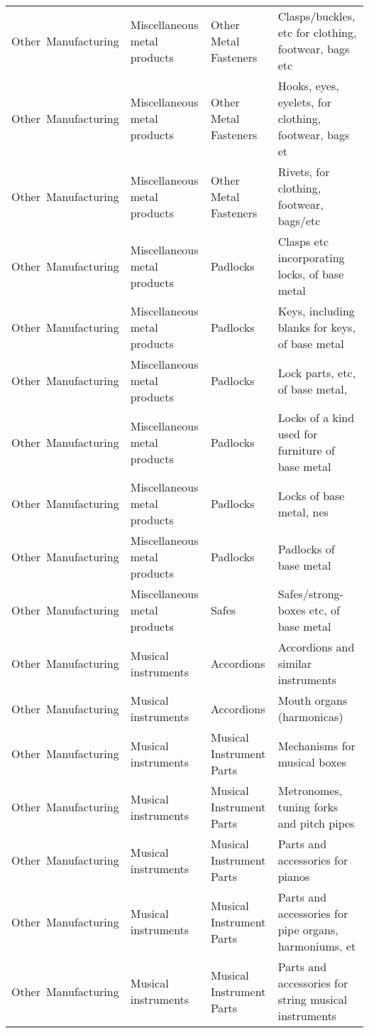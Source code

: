 \begin{appendices}
\begin{xltabular}{\textwidth}{|p{0.11\textwidth}|p{0.29\textwidth}|p{0.20\textwidth}|p{0.30\textwidth}|}
			Other\ Manufacturing & Miscellaneous metal products & Other Metal Fasteners & Clasps/buckles, etc for clothing, footwear, bags etc \\
			Other\ Manufacturing & Miscellaneous metal products & Other Metal Fasteners & Hooks, eyes, eyelets, for clothing, footwear, bags et \\
			Other\ Manufacturing & Miscellaneous metal products & Other Metal Fasteners & Rivets, for clothing, footwear, bags/etc \\
			Other\ Manufacturing & Miscellaneous metal products & Padlocks & Clasps etc incorporating locks, of base metal \\
			Other\ Manufacturing & Miscellaneous metal products & Padlocks & Keys, including blanks for keys, of base metal \\
			Other\ Manufacturing & Miscellaneous metal products & Padlocks & Lock parts, etc, of base metal, \\
			Other\ Manufacturing & Miscellaneous metal products & Padlocks & Locks of a kind used for furniture of base metal \\
			Other\ Manufacturing & Miscellaneous metal products & Padlocks & Locks of base metal, nes \\
			Other\ Manufacturing & Miscellaneous metal products & Padlocks & Padlocks of base metal \\
			Other\ Manufacturing & Miscellaneous metal products & Safes & Safes/strong-boxes etc, of base metal \\
			Other\ Manufacturing & Musical instruments & Accordions & Accordions and similar instruments \\
			Other\ Manufacturing & Musical instruments & Accordions & Mouth organs (harmonicas) \\
			Other\ Manufacturing & Musical instruments & Musical Instrument Parts & Mechanisms for musical boxes \\
			Other\ Manufacturing & Musical instruments & Musical Instrument Parts & Metronomes, tuning forks and pitch pipes \\
			Other\ Manufacturing & Musical instruments & Musical Instrument Parts & Parts and accessories for pianos \\
			Other\ Manufacturing & Musical instruments & Musical Instrument Parts & Parts and accessories for pipe organs, harmoniums, et \\
			Other\ Manufacturing & Musical instruments & Musical Instrument Parts & Parts and accessories for string musical instruments \\

\end{xltabular}
\end{appendices}
